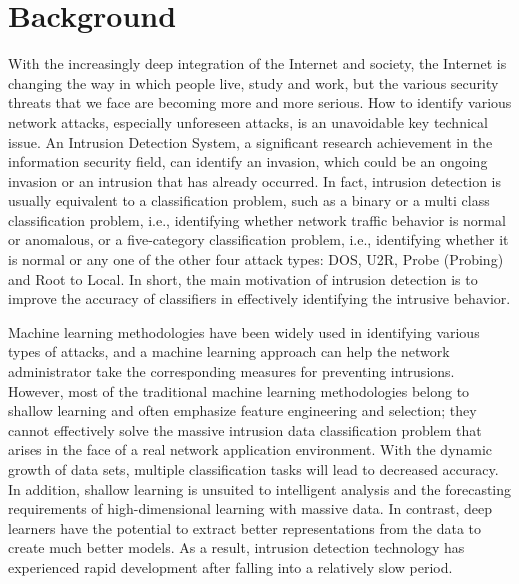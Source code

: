\section{Background}\label{sec:bkgrnd}%
\vspace{-18pt}
With the increasingly deep integration of the Internet and society, the Internet is changing the way in which people live, study and work, but the various security threats that we face are becoming more and more serious. How to identify various network attacks, especially unforeseen attacks, is an unavoidable key technical issue. An Intrusion Detection System, a significant research achievement in the information security field, can identify an invasion, which could be an ongoing invasion or an intrusion that has already occurred. In fact, intrusion detection is usually equivalent to a classification problem, such as a binary or a multi class classification problem, i.e., identifying whether network traffic behavior is normal or anomalous, or a five-category classification problem, i.e., identifying whether it is normal or any one of the other four attack types: DOS, U2R, Probe (Probing) and Root to Local. In short, the main motivation of intrusion detection is to improve the accuracy of classifiers in effectively identifying the intrusive behavior.\par
Machine learning methodologies have been widely used in identifying various types of attacks, and a machine learning approach can help the network administrator take the corresponding measures for preventing intrusions. However, most of the traditional machine learning methodologies belong to shallow learning and often emphasize feature engineering and selection; they cannot effectively solve the massive intrusion data classification problem that arises in the face of a real network application environment. With the dynamic growth of data sets, multiple classification tasks will lead to decreased accuracy. In addition, shallow learning is unsuited to intelligent analysis and the forecasting requirements of high-dimensional learning with massive data. In contrast, deep learners have the potential to extract better representations from the data to create much better models. As a result, intrusion detection technology has experienced rapid development after falling into a relatively slow period\cite{yin2017deep}.%
\par
